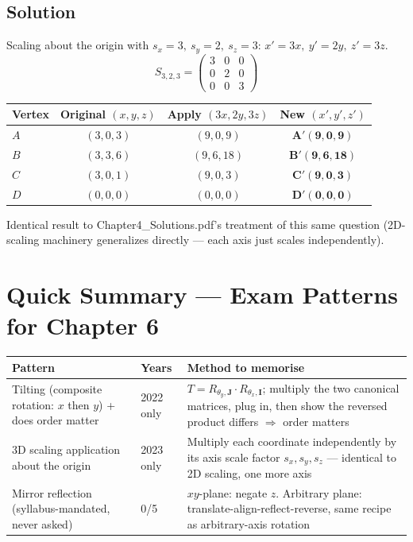 \documentclass[12pt, a4paper]{article}
\newenvironment{solutionbox}{\begin{mdframed}[style=solutionframe]}{\end{mdframed}}
\begin{document}
\subsection*{Solution}
\begin{solutionbox}
Scaling about the origin with $s_x=3,\ s_y=2,\ s_z=3$: $x'=3x,\ y'=2y,\ z'=3z$.
$$S_{3,2,3}=\begin{pmatrix}3&0&0\\0&2&0\\0&0&3\end{pmatrix}$$
\begin{center}
\begin{tabular}{lccc}
\toprule
Vertex & Original $(x,y,z)$ & Apply $(3x,2y,3z)$ & New $(x',y',z')$ \\
\midrule
$A$ & $(3,0,3)$ & $(9,0,9)$ & $\mathbf{A'(9,0,9)}$ \\
$B$ & $(3,3,6)$ & $(9,6,18)$ & $\mathbf{B'(9,6,18)}$ \\
$C$ & $(3,0,1)$ & $(9,0,3)$ & $\mathbf{C'(9,0,3)}$ \\
$D$ & $(0,0,0)$ & $(0,0,0)$ & $\mathbf{D'(0,0,0)}$ \\
\bottomrule
\end{tabular}
\end{center}
Identical result to Chapter4\_Solutions.pdf's treatment of this same question (2D-scaling machinery generalizes directly --- each axis just scales independently).
\end{solutionbox}

\section{Quick Summary --- Exam Patterns for Chapter 6}

\begin{center}
\renewcommand{\arraystretch}{1.3}
\begin{tabular}{p{4.5cm}|p{2.4cm}|p{7.1cm}}
\toprule
\textbf{Pattern} & \textbf{Years} & \textbf{Method to memorise} \\
\midrule
Tilting (composite rotation: $x$ then $y$) + does order matter & 2022 only & $T=R_{\theta_y,\mathbf J}\cdot R_{\theta_x,\mathbf I}$; multiply the two canonical matrices, plug in, then show the reversed product differs $\Rightarrow$ order matters \\
3D scaling application about the origin & 2023 only & Multiply each coordinate independently by its axis scale factor $s_x,s_y,s_z$ --- identical to 2D scaling, one more axis \\
Mirror reflection (syllabus-mandated, never asked) & 0/5 & $xy$-plane: negate $z$. Arbitrary plane: translate-align-reflect-reverse, same recipe as arbitrary-axis rotation \\
\bottomrule
\end{tabular}
\end{center}
\end{document}
